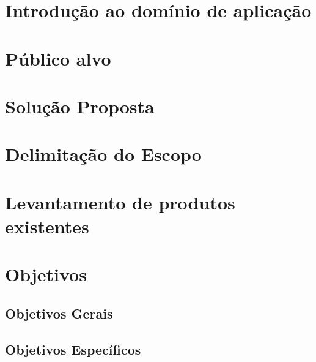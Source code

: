 %

\section{Introdução ao domínio de aplicação}

\section{Público alvo}

\section{Solução Proposta}

\section{Delimitação do Escopo}

\section{Levantamento de produtos existentes}

\section{Objetivos}
\subsection{Objetivos Gerais}

\subsection{Objetivos Específicos}
